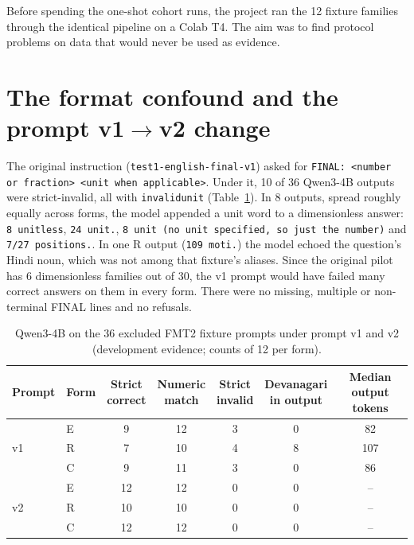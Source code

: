 \documentclass[12pt,a4paper,oneside]{report}
\renewcommand{\_}{\oldunderscore\allowbreak}
\begin{document}
Before spending the one-shot cohort runs, the project ran the 12 fixture families through the identical pipeline on a Colab T4. The aim was to find protocol problems on data that would never be used as evidence.

\section{The format confound and the prompt v1$\to$v2 change}

The original instruction (\texttt{test1-english-final-v1}) asked for \texttt{FINAL: <number or fraction> <unit when applicable>}. Under it, 10 of 36 Qwen3-4B outputs were strict-invalid, all with \texttt{invalid\_unit} (Table~\ref{tab:fmt2}). In 8 outputs, spread roughly equally across forms, the model appended a unit word to a dimensionless answer: \texttt{8 unitless}, \texttt{24 unit.}, \texttt{8 unit (no unit specified, so just the number)} and \texttt{7/27 positions.}. In one R output (\texttt{109 moti.}) the model echoed the question's Hindi noun, which was not among that fixture's aliases. Since the original pilot has 6 dimensionless families out of 30, the v1 prompt would have failed many correct answers on them in every form. There were no missing, multiple or non-terminal FINAL lines and no refusals.

\begin{table}[t]
\centering\small
\caption{Qwen3-4B on the 36 excluded FMT2 fixture prompts under prompt v1 and v2 (development evidence; counts of 12 per form).}
\label{tab:fmt2}
\begin{tabular}{@{}llccccc@{}}
\toprule
Prompt & Form & \makecell{Strict\\correct} & \makecell{Numeric\\match} & \makecell{Strict\\invalid} & \makecell{Devanagari\\in output} & \makecell{Median\\output tokens}\\
\midrule
\multirow{3}{*}{v1} & E & 9 & 12 & 3 & 0 & 82\\
 & R & 7 & 10 & 4 & 8 & 107\\
 & C & 9 & 11 & 3 & 0 & 86\\
\midrule
\multirow{3}{*}{v2} & E & 12 & 12 & 0 & 0 & --\\
 & R & 10 & 10 & 0 & 0 & --\\
 & C & 12 & 12 & 0 & 0 & --\\
\bottomrule
\end{tabular}
\end{table}
\end{document}
